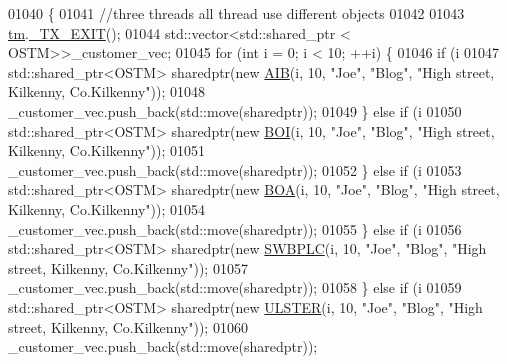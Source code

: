 \begin{DoxyCode}
01040                                                      \{
01041     \textcolor{comment}{//three threads all thread use different objects }
01042 
01043     \hyperlink{class_my_test_c_ase_a422e6e5d4ddedea384be96031c89b72b_a422e6e5d4ddedea384be96031c89b72b}{tm}.\hyperlink{class_t_m_a5e2d1127f2429f2f524d25f430eade06_a5e2d1127f2429f2f524d25f430eade06}{\_TX\_EXIT}();
01044     std::vector<std::shared\_ptr < OSTM>>\_customer\_vec; 
01045      \textcolor{keywordflow}{for} (\textcolor{keywordtype}{int} i = 0; i < 10; ++i) \{
01046         \textcolor{keywordflow}{if} (i %
01047             std::shared\_ptr<OSTM> sharedptr(\textcolor{keyword}{new} \hyperlink{class_a_i_b}{AIB}(i, 10, \textcolor{stringliteral}{"Joe"}, \textcolor{stringliteral}{"Blog"}, \textcolor{stringliteral}{"High street, Kilkenny,
       Co.Kilkenny"}));
01048             \_customer\_vec.push\_back(std::move(sharedptr));
01049         \} \textcolor{keywordflow}{else} \textcolor{keywordflow}{if} (i %
01050             std::shared\_ptr<OSTM> sharedptr(\textcolor{keyword}{new} \hyperlink{class_b_o_i}{BOI}(i, 10, \textcolor{stringliteral}{"Joe"}, \textcolor{stringliteral}{"Blog"}, \textcolor{stringliteral}{"High street, Kilkenny,
       Co.Kilkenny"}));
01051             \_customer\_vec.push\_back(std::move(sharedptr));
01052         \} \textcolor{keywordflow}{else} \textcolor{keywordflow}{if} (i %
01053             std::shared\_ptr<OSTM> sharedptr(\textcolor{keyword}{new} \hyperlink{class_b_o_a}{BOA}(i, 10, \textcolor{stringliteral}{"Joe"}, \textcolor{stringliteral}{"Blog"}, \textcolor{stringliteral}{"High street, Kilkenny,
       Co.Kilkenny"}));
01054             \_customer\_vec.push\_back(std::move(sharedptr));
01055         \} \textcolor{keywordflow}{else} \textcolor{keywordflow}{if} (i %
01056             std::shared\_ptr<OSTM> sharedptr(\textcolor{keyword}{new} \hyperlink{class_s_w_b_p_l_c}{SWBPLC}(i, 10, \textcolor{stringliteral}{"Joe"}, \textcolor{stringliteral}{"Blog"}, \textcolor{stringliteral}{"High street, Kilkenny,
       Co.Kilkenny"}));
01057             \_customer\_vec.push\_back(std::move(sharedptr));
01058         \} \textcolor{keywordflow}{else} \textcolor{keywordflow}{if} (i %
01059             std::shared\_ptr<OSTM> sharedptr(\textcolor{keyword}{new} \hyperlink{class_u_l_s_t_e_r}{ULSTER}(i, 10, \textcolor{stringliteral}{"Joe"}, \textcolor{stringliteral}{"Blog"}, \textcolor{stringliteral}{"High street, Kilkenny,
       Co.Kilkenny"}));
01060             \_customer\_vec.push\_back(std::move(sharedptr));

\end{DoxyCode}

